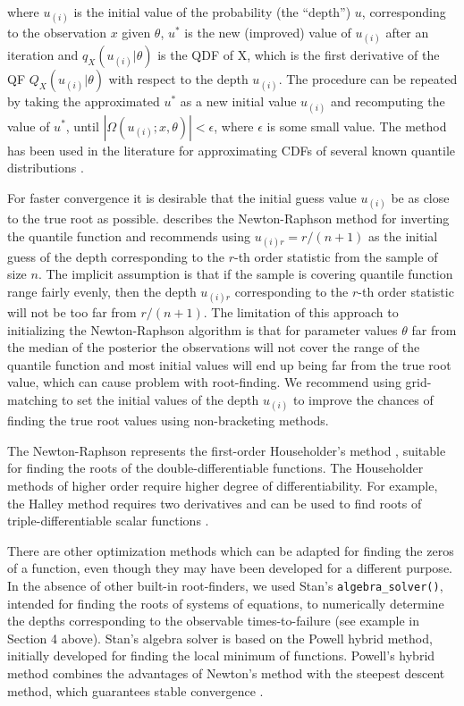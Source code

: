 \documentclass[ba]{imsart}
\numberwithin{equation}{section}
\theoremstyle{plain}
\begin{document}
where \(u_{(i)}\) is the initial value of the probability (the ``depth'') \(u\), corresponding to the observation \(x\) given \(\theta\), \(u^*\) is the new (improved) value of \(u_{(i)}\) after an iteration and \(q_X(u_{(i)}|\theta)\) is the QDF of X, which is the first derivative of the QF \(Q_X(u_{(i)}|\theta)\) with respect to the depth \(u_{(i)}\). The procedure can be repeated by taking the approximated \(u^*\) as a new initial value \(u_{(i)}\) and recomputing the value of \(u^*\), until \(|\Omega(u_{(i)};x,\theta)|< \epsilon\), where \(\epsilon\) is some small value. The method has been used in the literature for approximating CDFs of several known quantile distributions \citetext{\citealp[see p.99 in][]{gilchrist2000StatisticalModellingQuantile}; \citealp[p.345 in][]{nair2013QuantileBasedReliabilityAnalysis}}.

For faster convergence it is desirable that the initial guess value \(u_{(i)}\) be as close to the true root as possible. \citet{gilchrist2000StatisticalModellingQuantile} describes the Newton-Raphson method for inverting the quantile function and recommends using \(u_{(i)r}=r/(n+1)\) as the initial guess of the depth corresponding to the \(r\)-th order statistic from the sample of size \(n\). The implicit assumption is that if the sample is covering quantile function range fairly evenly, then the depth \(u_{(i)r}\) corresponding to the \(r\)-th order statistic will not be too far from \(r/(n+1)\). The limitation of this approach to initializing the Newton-Raphson algorithm is that for parameter values \(\theta\) far from the median of the posterior the observations will not cover the range of the quantile function and most initial values will end up being far from the true root value, which can cause problem with root-finding. We recommend using grid-matching to set the initial values of the depth \(u_{(i)}\) to improve the chances of finding the true root values using non-bracketing methods.

The Newton-Raphson represents the first-order Householder's method \citep{householder1970NumericalTreatmentSingle}, suitable for finding the roots of the double-differentiable functions. The Householder methods of higher order require higher degree of differentiability. For example, the Halley method requires two derivatives and can be used to find roots of triple-differentiable scalar functions \citep{scavo1995GeometryHalleyMethod}.

There are other optimization methods which can be adapted for finding the zeros of a function, even though they may have been developed for a different purpose. In the absence of other built-in root-finders, we used Stan's \texttt{algebra\_solver()}, intended for finding the roots of systems of equations, to numerically determine the depths corresponding to the observable times-to-failure (see example in Section 4 above). Stan's algebra solver is based on the Powell hybrid method, initially developed for finding the local minimum of functions. Powell's hybrid method combines the advantages of Newton's method with the steepest descent method, which guarantees stable convergence \citep{powell1970HybridMethodNonlinear}.
\end{document}
